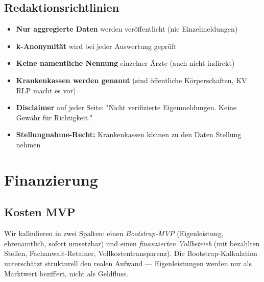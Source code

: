 \documentclass{umbruch-position}
\begin{document}
\subsection{Redaktionsrichtlinien}

\begin{itemize}[nosep]
  \item \textbf{Nur aggregierte Daten} werden veröffentlicht (nie Einzelmeldungen)
  \item \textbf{k-Anonymität} wird bei jeder Auswertung geprüft
  \item \textbf{Keine namentliche Nennung} einzelner Ärzte (auch nicht indirekt)
  \item \textbf{Krankenkassen werden genannt} (sind öffentliche Körperschaften, KV RLP macht es vor)
  \item \textbf{Disclaimer} auf jeder Seite: "Nicht verifizierte Eigenmeldungen. Keine Gewähr für Richtigkeit."
  \item \textbf{Stellungnahme-Recht:} Krankenkassen können zu den Daten Stellung nehmen
\end{itemize}


\section{Finanzierung}

\subsection{Kosten MVP}

Wir kalkulieren in zwei Spalten: einen \emph{Bootstrap-MVP} (Eigenleistung, ehrenamtlich, sofort umsetzbar) und einen \emph{finanzierten Vollbetrieb} (mit bezahlten Stellen, Fachanwalt-Retainer, Vollkostentransparenz). Die Bootstrap-Kalkulation unterschätzt strukturell den realen Aufwand --- Eigenleistungen werden nur als Marktwert beziffert, nicht als Geldfluss.
\end{document}
